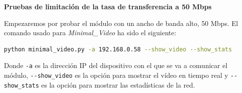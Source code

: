\newpage

\textbf{Pruebas de limitación de la tasa de transferencia a 50 Mbps}
\vspace{\baselineskip}

Empezaremos por probar el módulo con un ancho de banda alto, 50 Mbps. El comando usado para \textit{Minimal\_Video} ha sido el siguiente:

\begin{lstlisting}[language=bash]
python minimal_video.py -a 192.168.0.58 --show_video --show_stats
\end{lstlisting}
Donde \verb|-a| es la dirección IP del dispositivo con el que se va a comunicar el módulo, \verb|--show_video| es la opción para mostrar el vídeo en tiempo real y \verb|--show_stats| es la opción para mostrar las estadísticas de la red.
\vspace{\baselineskip}

